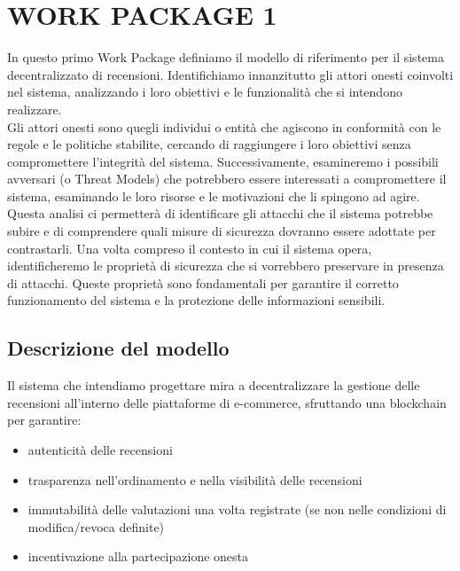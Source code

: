 %
%
%

\chapter{WORK PACKAGE 1}
    In questo primo Work Package definiamo il modello di riferimento per il sistema decentralizzato di recensioni. Identifichiamo innanzitutto gli attori onesti coinvolti nel sistema, analizzando i loro obiettivi e le funzionalità che si intendono realizzare. \\
    Gli attori onesti sono quegli individui o entità che agiscono in conformità con le regole e le politiche stabilite, cercando di raggiungere i loro obiettivi senza compromettere l'integrità del sistema.
    Successivamente, esamineremo i possibili avversari (o Threat Models) che potrebbero essere interessati a compromettere il sistema, esaminando le loro risorse e le motivazioni che li spingono ad agire.
    Questa analisi ci permetterà di identificare gli attacchi che il sistema potrebbe subire e di comprendere quali misure di sicurezza dovranno essere adottate per contrastarli.
    Una volta compreso il contesto in cui il sistema opera, identificheremo le proprietà di sicurezza che si vorrebbero preservare in presenza di attacchi.
    Queste proprietà sono fondamentali per garantire il corretto funzionamento del sistema e la protezione delle informazioni sensibili.
    
    \section{Descrizione del modello}
        Il sistema che intendiamo progettare mira a decentralizzare la gestione delle recensioni all'interno delle piattaforme di e-commerce, sfruttando una blockchain per garantire:
            \begin{itemize}
                \item autenticità delle recensioni
        
                \item trasparenza nell'ordinamento e nella visibilità delle recensioni
        
                \item immutabilità delle valutazioni una volta registrate (se non nelle condizioni di modifica/revoca definite)
        
                \item incentivazione alla partecipazione onesta
            \end{itemize}
        
